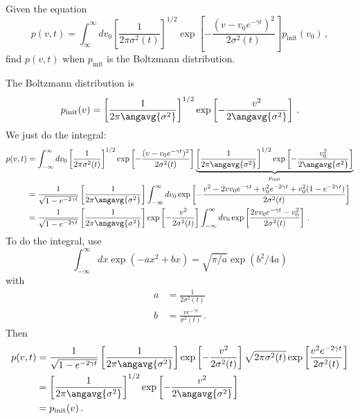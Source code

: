 Given the equation
\begin{equation*}
  p(v, t)
  = \int_{\infty}^\infty
  d v_0 \left[ \frac{1}{2 \pi \sigma^2(t)} \right]^{1/2}
  \exp \left[
    - \frac{ \left( v - v_0 e^{- \gamma t} \right)^2}{2 \sigma^2(t)}
  \right]
  p_\text{init}(v_0)
  \, ,
\end{equation*}
find $p(v, t)$ when $p_\text{init}$ is the Boltzmann distribution.

The Boltzmann distribution is
\begin{equation*}
  p_\text{init}(v)
  = \left[
    \frac{1}{2 \pi \angavg{\sigma^2}}
  \right]^{1/2}
  \exp \left[
    - \frac{v^2}{2 \angavg{\sigma^2}}
  \right]
  \, .
\end{equation*}
We just do the integral:
\begin{align*}
  p(v, t)
  &= \int_{-\infty}^\infty
    dv_0 \left[ \frac{1}{2 \pi \sigma^2(t) }\right]^{1/2}
    \exp \left[ - \frac{(v - v_0 e^{- \gamma t})^2}{2 \sigma^2(t)} \right]
    \underbrace{\left[ \frac{1}{2\pi \angavg{\sigma^2}} \right]^{1/2} \exp \left[ - \frac{v_0^2}{2 \angavg{\sigma^2}} \right] }_{p_\text{init}} \\
  &=
    \frac{1}{\sqrt{1 - e^{-2 \gamma t}}}
    \left[ \frac{1}{2\pi \angavg{\sigma^2}} \right]
    \int_{-\infty}^\infty
    dv_0
    \exp \left[
      - \frac{v^2 -2 v v_0 e^{- \gamma t} + v_0^2 e^{-2 \gamma t} + v_0^2 (1 - e^{-2 \gamma t})}{2 \sigma^2(t)}
    \right] \\
  &=
    \frac{1}{\sqrt{1 - e^{-2 \gamma t}}}
    \left[ \frac{1}{2\pi \angavg{\sigma^2}} \right]
    \exp \left[ - \frac{v^2}{2 \sigma^2(t)} \right]
    \int_{-\infty}^\infty
    dv_0
    \exp \left[
      \frac{2 v v_0 e^{- \gamma t} - v_0^2}{2 \sigma^2(t)}
    \right]
  \, .
\end{align*}
To do the integral, use
\begin{equation*}
  \int_{-\infty}^\infty dx \exp(-a x^2 + bx) = \sqrt{\pi / a} \exp(b^2 / 4 a)
\end{equation*}
with
\begin{align*}
  a &= \frac{1}{2 \sigma^2(t)} \\
  b &= \frac{v e^{-\gamma t}}{\sigma^2(t)}
  \, .
\end{align*}
Then
\begin{align*}
  p(v, t) &=
    \frac{1}{\sqrt{1 - e^{-2 \gamma t}}}
    \left[ \frac{1}{2\pi \angavg{\sigma^2}} \right]
    \exp \left[ - \frac{v^2}{2 \sigma^2(t)} \right]
    \sqrt{2 \pi \sigma^2(t)} \exp \left[
      \frac{v^2 e^{-2 \gamma t}}{2 \sigma^2(t)}
    \right] \\
  &= 
    \left[ \frac{1}{2 \pi \angavg{\sigma^2}} \right]^{1/2}
    \exp \left[ - \frac{v^2}{2 \angavg{\sigma^2}} \right] \\
  &= p_\text{init}(v)
  \, .
\end{align*}
